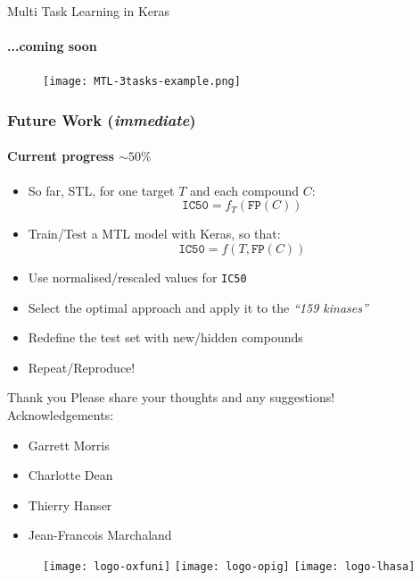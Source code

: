\documentclass[11pt]{beamer}
\newcommand{\icfifty}{\texttt{IC50}}
\begin{document}
\begin{frame}{Multi Task Learning in Keras}
	\framesubtitle{...coming soon}
	\begin{figure}
		\texttt{[image: MTL-3tasks-example.png]}
	\end{figure}
\end{frame}

\begin{frame}
\frametitle{Future Work (\textit{immediate})}
\framesubtitle{Current progress $\sim 50\% $}
\begin{itemize}
  \setlength\itemsep{1em}
	\item So far, STL, for one target $T$ and each compound $C$: \[ \icfifty = f_{T}(\texttt{FP}(C)) \]
	\item Train/Test a MTL model with Keras, so that: \[ \icfifty = f(T,\texttt{FP}(C)) \]
	\item Use normalised/rescaled values for \icfifty 
	\item Select the optimal approach and apply it to the \textit{``159 kinases''}
	\item Redefine the test set with new/hidden compounds
	
	\item Repeat/Reproduce!
\end{itemize}
\end{frame}

\begin{frame}{Thank you}
	Please share your thoughts and any suggestions!\\
	\vspace{1em}
	Acknowledgements:
	\begin{itemize}
		\item Garrett Morris
		\item Charlotte Dean
		\item Thierry Hanser
		\item Jean-Francois Marchaland
	\end{itemize}
	\vfill
	\begin{figure}
		\texttt{[image: logo-oxfuni]}\hfill %
		\texttt{[image: logo-opig]}\hfill %
		\texttt{[image: logo-lhasa]} 
	\end{figure}
\end{frame}
\end{document}
